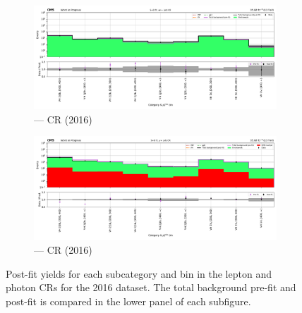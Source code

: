 \begin{figure}[htbp]
    \begin{subfigure}[b]{0.51\textwidth}
        \includegraphics[width=\textwidth]{chapters/higgstoinv/figures/mountain_ranges/2016/VH/Zee_tree_fit_s-abs_values_VH_cats.pdf}
        \caption{\VH --- \doubleEleCr \gls{CR} (2016)}
    \end{subfigure}

    \begin{subfigure}[b]{0.51\textwidth}
        \includegraphics[width=\textwidth]{chapters/higgstoinv/figures/mountain_ranges/2016/VH/Photon_tree_fit_s-abs_values_VH_cats.pdf}
        \caption{\VH --- \singlePhotonCr \gls{CR} (2016)}
    \end{subfigure}
    \caption[Post-fit yields for each \VH subcategory and \ptmiss bin in the lepton and photon control regions for the 2016 dataset]{Post-fit yields for each \VH subcategory and \ptmiss bin in the lepton and photon \glspl{CR} for the 2016 dataset. The total background pre-fit and post-fit is compared in the lower panel of each subfigure.}
    \label{fig:htoinv_mountain_range_VH_2016_CRs}
\end{figure}

